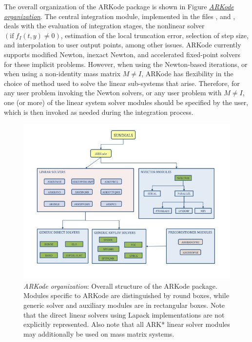 \documentclass[letterpaper,10pt,english]{sphinxmanual}
\begin{document}
The overall organization of the ARKode package is shown in Figure
{\hyperref[Organization:arkorg]{\emph{ARKode organization}}}.  The central integration module,
implemented in the files ,  and
, deals with the evaluation of integration stages, the
nonlinear solver $(\text{if}\; f_I(t,y)\ne 0)$, estimation of
the local truncation error, selection of step size, and interpolation
to user output points, among other issues.  ARKode currently supports
modified Newton, inexact Newton, and accelerated fixed-point solvers
for these implicit problems.  However, when using the Newton-based
iterations, or when using a non-identity mass matrix $M\ne I$,
ARKode has flexibility in the choice of method used to solve the
linear sub-systems that arise.  Therefore, for any user problem
invoking the Newton solvers, or any user problem with $M\ne I$,
one (or more) of the linear system solver modules should be specified
by the user, which is then invoked as needed during the integration
process.
\begin{figure}[htbp]
\centering
\capstart

\includegraphics{arkorg.png}
\caption{\emph{ARKode organization}: Overall structure of the ARKode package.
Modules specific to ARKode are distinguished by round boxes, while
generic solver and auxiliary modules are in rectangular boxes.
Note that the direct linear solvers using Lapack implementations
are not explicitly represented.  Also note that all ARK* linear
solver modules may additionally be used on mass matrix systems.}\label{Organization:arkorg}\end{figure}
\end{document}
